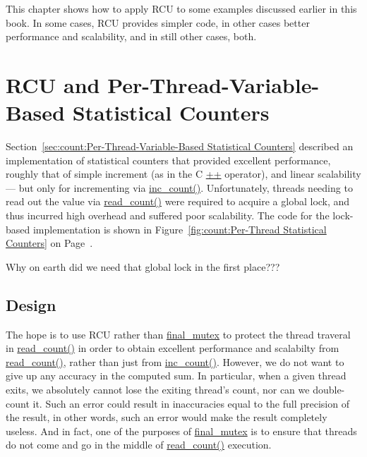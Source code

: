 

This chapter shows how to apply RCU to some examples discussed earlier
in this book.
In some cases, RCU provides simpler code, in other cases better
performance and scalability, and in still other cases, both.

\section{RCU and Per-Thread-Variable-Based Statistical Counters}
\label{sec:count:RCU and Per-Thread-Variable-Based Statistical Counters}

Section~\ref{sec:count:Per-Thread-Variable-Based Statistical Counters}
described an implementation of statistical counters that provided
excellent
performance, roughly that of simple increment (as in the C \url{++}
operator), and linear scalability --- but only for incrementing
via \url{inc_count()}.
Unfortunately, threads needing to read out the value via \url{read_count()}
were required to acquire a global
lock, and thus incurred high overhead and suffered poor scalability.
The code for the lock-based implementation is shown in
Figure~\ref{fig:count:Per-Thread Statistical Counters} on
Page~\pageref{fig:count:Per-Thread Statistical Counters}.

\QuickQuiz{}
	Why on earth did we need that global lock in the first place???
 \QuickQuizEnd

\subsection{Design}

The hope is to use RCU rather than \url{final_mutex} to protect the
thread traveral in \url{read_count()} in order to obtain excellent
performance and scalabilty from \url{read_count()}, rather than just
from \url{inc_count()}.
However, we do not want to give up any accuracy in the computed sum.
In particular, when a given thread exits, we absolutely cannot
lose the exiting thread's count, nor can we double-count it.
Such an error could result in inaccuracies equal to the full
precision of the result, in other words, such an error would
make the result completely useless.
And in fact, one of the purposes of \url{final_mutex} is to
ensure that threads do not come and go in the middle of \url{read_count()}
execution.

